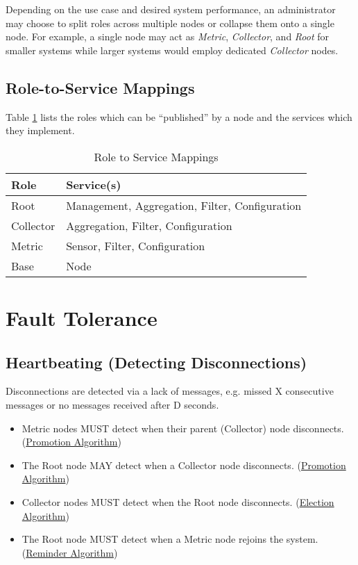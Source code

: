 Depending on the use case and desired system performance, an administrator may choose to split roles across multiple
nodes or collapse them onto a single node. For example, a single node may act as \textit{Metric}, \textit{Collector},
and \textit{Root} for smaller systems while larger systems would employ dedicated \textit{Collector} nodes.

\subsection{Role-to-Service Mappings}

Table \ref{tab:role_to_services} lists the roles which can be ``published'' by a \dcamp node and the services which they
implement.

\begin{table}
\begin{tabular}{|l|l|}
\hline
\textbf{Role} & \textbf{Service(s)} \\
\hline
Root & Management, Aggregation, Filter, Configuration \\
\hline
Collector & Aggregation, Filter, Configuration \\
\hline
Metric & Sensor, Filter, Configuration \\
\hline
Base & Node \\
\hline
\end{tabular}
\caption{Role to Service Mappings}
\label{tab:role_to_services}
\end{table}

\section{Fault Tolerance}

\subsection{Heartbeating (Detecting Disconnections)}

Disconnections are detected via a lack of messages, e.g. missed X consecutive messages or no messages received after D
seconds.

\begin{itemize}
\item Metric nodes MUST detect when their parent (Collector) node disconnects. (\hyperref[algor_promo]{Promotion Algorithm})
\item The Root node MAY detect when a Collector node disconnects. (\hyperref[algor_promo]{Promotion Algorithm})
\item Collector nodes MUST detect when the Root node disconnects. (\hyperref[algor_elect]{Election Algorithm})
\item The Root node MUST detect when a Metric node rejoins the system. (\hyperref[algor_remind]{Reminder Algorithm})
\end{itemize}

